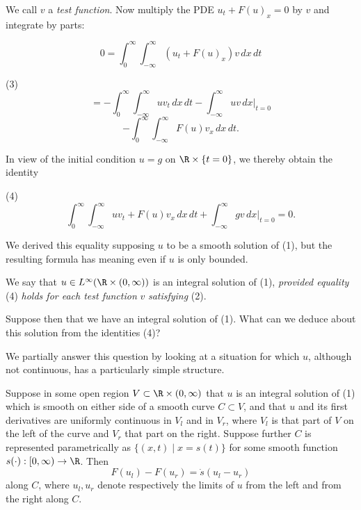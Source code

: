 We call $v$ a \textit{test function}. Now multiply the PDE $u_t + F(u)_x = 0$ by $v$ and integrate by parts:

$$0 = \int_0^\infty \int_{-\infty}^\infty (u_t + F(u)_x) v \, dx \, dt$$

(3)
$$= -\int_0^\infty \int_{-\infty}^\infty u v_t \, dx \, dt - \int_{-\infty}^\infty uv \, dx|_{t=0}$$
$$- \int_0^\infty \int_{-\infty}^\infty F(u) v_x \, dx \, dt.$$

In view of the initial condition $u = g$ on $\R \times \{t = 0\}$, we thereby obtain the identity

(4)
$$\int_0^\infty \int_{-\infty}^\infty u v_t + F(u) v_x \, dx \, dt + \int_{-\infty}^\infty gv \, dx|_{t=0} = 0.$$

We derived this equality supposing $u$ to be a smooth solution of (1), but the resulting formula has meaning even if $u$ is only bounded.

\begin{definition}
\label{def:integral-solution-conservation-law}
We say that $u \in L^\infty(\R \times (0,\infty))$ is an integral solution of (1), \textit{provided equality} (4) \textit{holds for each test function} $v$ \textit{satisfying} (2).
\end{definition}

Suppose then that we have an integral solution of (1). What can we deduce about this solution from the identities (4)?

We partially answer this question by looking at a situation for which $u$, although not continuous, has a particularly simple structure.

\begin{proposition}
\label{prop:rankine-hugoniot-condition}
Suppose in some open region $V \subset \R \times (0, \infty)$ that $u$ is an integral solution of (1) which is smooth on either side of a smooth curve $C \subset V$, and that $u$ and its first derivatives are uniformly continuous in $V_l$ and in $V_r$, where $V_l$ is that part of $V$ on the left of the curve and $V_r$ that part on the right. Suppose further $C$ is represented parametrically as $\{(x,t) \mid x = s(t)\}$ for some smooth function $s(\cdot) : [0,\infty) \to \R$. Then
$$F(u_l) - F(u_r) = \dot{s}(u_l - u_r)$$
along $C$, where $u_l, u_r$ denote respectively the limits of $u$ from the left and from the right along $C$.
\end{proposition}


